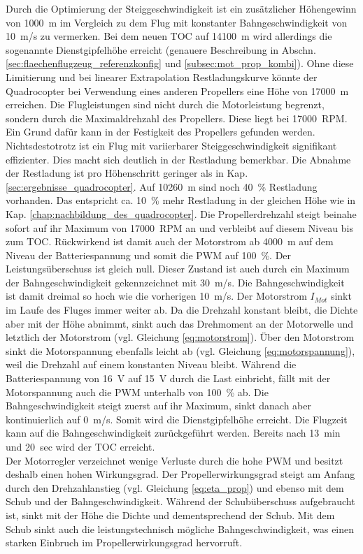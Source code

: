 Durch die Optimierung der Steiggeschwindigkeit ist ein zusätzlicher Höhengewinn von \SI{1000}{m} im Vergleich zu dem Flug mit konstanter Bahngeschwindigkeit von \SI{10}{m/s} zu vermerken. Bei dem neuen TOC auf \SI{14100}{m} wird allerdings die sogenannte Dienstgipfelhöhe erreicht (genauere Beschreibung in Abschn. \ref{sec:flaechenflugzeug_referenzkonfig} und \ref{subsec:mot_prop_kombi}). Ohne diese Limitierung und bei linearer Extrapolation Restladungskurve könnte der Quadrocopter bei Verwendung eines anderen Propellers eine Höhe von \SI{17000}{m} erreichen. Die Flugleistungen sind nicht durch die Motorleistung begrenzt, sondern durch die Maximaldrehzahl des Propellers. Diese liegt bei \SI{17000}{RPM}. Ein Grund dafür kann in der Festigkeit des Propellers gefunden werden. Nichtsdestotrotz ist ein Flug mit variierbarer Steiggeschwindigkeit signifikant effizienter. Dies macht sich deutlich in der Restladung bemerkbar. Die Abnahme der Restladung ist pro Höhenschritt geringer als in Kap. \ref{sec:ergebnisse_quadrocopter}. Auf \SI{10260}{m} sind noch \SI{40}{\%} Restladung vorhanden. Das entspricht ca. \SI{10}{\%} mehr Restladung in der gleichen Höhe wie in Kap. \ref{chap:nachbildung_des_quadrocopter}. Die Propellerdrehzahl steigt beinahe sofort auf ihr Maximum von \SI{17000}{RPM} an und verbleibt auf diesem Niveau bis zum TOC. Rückwirkend ist damit auch der Motorstrom ab \SI{4000}{m} auf dem Niveau der Batteriespannung und somit die PWM auf \SI{100}{\%}. Der Leistungsüberschuss ist gleich null. Dieser Zustand ist auch durch ein Maximum der Bahngeschwindigkeit gekennzeichnet mit \SI{30}{m/s}. Die Bahngeschwindigkeit ist damit dreimal so hoch wie die vorherigen \SI{10}{m/s}. Der Motorstrom \ensuremath{I_{Mot}} sinkt im Laufe des Fluges immer weiter ab. Da die Drehzahl konstant bleibt, die Dichte aber mit der Höhe abnimmt, sinkt auch das Drehmoment an der Motorwelle und letztlich der Motorstrom (vgl. Gleichung \eqref{eq:motorstrom}). Über den Motorstrom sinkt die Motorspannung ebenfalls leicht ab (vgl. Gleichung \eqref{eq:motorspannung}), weil die Drehzahl auf einem konstanten Niveau bleibt. Während die Batteriespannung von \SI{16}{V} auf \SI{15}{V} durch die Last einbricht, fällt mit der Motorspannung auch die PWM unterhalb von \SI{100}{\%} ab. Die Bahngeschwindigkeit steigt zuerst auf ihr Maximum, sinkt danach aber kontinuierlich auf \SI{0}{m/s}. Somit wird die Dienstgipfelhöhe erreicht. Die Flugzeit kann auf die Bahngeschwindigkeit zurückgeführt werden. Bereits nach \SI{13}{min} und \SI{20}{sec} wird der TOC erreicht. \\
Der Motorregler verzeichnet wenige Verluste durch die hohe PWM und besitzt deshalb einen hohen Wirkungsgrad. Der Propellerwirkungsgrad steigt am Anfang durch den Drehzahlanstieg (vgl. Gleichung \eqref{eq:eta_prop}) und ebenso mit dem Schub und der Bahngeschwindigkeit. Während der Schubüberschuss aufgebraucht ist, sinkt mit der Höhe die Dichte und dementsprechend der Schub. Mit dem Schub sinkt auch die leistungstechnisch mögliche Bahngeschwindigkeit, was einen starken Einbruch im Propellerwirkungsgrad hervorruft.

